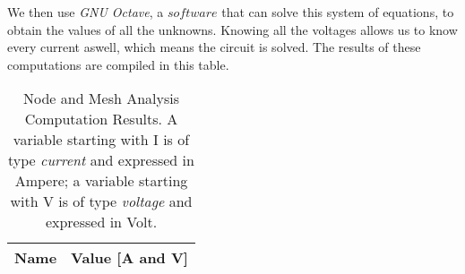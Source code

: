 We then use \textit{GNU Octave}, a $software$ that can solve this system of equations, to obtain the values of all the unknowns. Knowing all the voltages allows us to know every current aswell, which means the circuit is solved.
The results of these computations are compiled in this table.

\begin{table}[h]
  \centering
  \begin{tabular}{|l|r|}
    \hline    
    {\bf Name} & {\bf Value [A and V]} \\ \hline
    
  \end{tabular}
  \caption{Node and Mesh Analysis Computation Results. A variable starting with I is of type {\em current}
    and expressed in Ampere; a variable starting with V is of type {\it voltage} and expressed in
    Volt.}
  \label{tab:op}
\end{table}